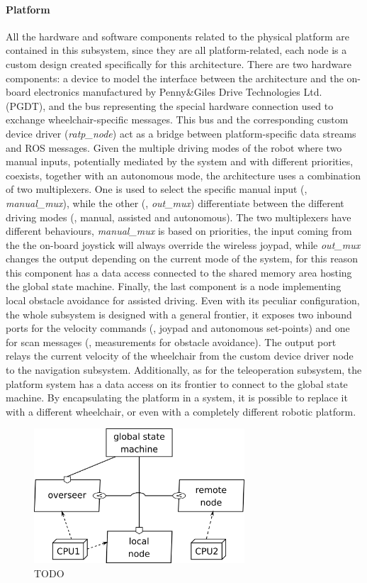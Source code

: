 \paragraph{Platform} All the hardware and software components related to the physical platform are contained in this subsystem, since they are all platform-related, each node is a custom design created specifically for this architecture. There are two hardware components: a device to model the interface between the architecture and the on-board electronics manufactured by Penny\&Giles Drive Technologies Ltd. (PGDT), and the bus representing the special hardware connection used to exchange wheelchair-specific messages. This bus and the corresponding custom device driver (\textit{ratp\_node}) act as a bridge between platform-specific data streams and ROS messages. Given the multiple driving modes of the robot where two manual inputs, potentially mediated by the system and with different priorities, coexists, together with an autonomous mode, the architecture uses a combination of two multiplexers. One is used to select the specific manual input (\ie, \textit{manual\_mux}), while the other (\ie, \textit{out\_mux}) differentiate between the different driving modes (\ie, manual, assisted and autonomous). The two multiplexers have different behaviours, \textit{manual\_mux} is based on priorities, the input coming from the the on-board joystick will always override the wireless joypad, while \textit{out\_mux} changes the output depending on the current mode of the system, for this reason this component has a data access connected to the shared memory area hosting the global state machine. Finally, the last component is a node implementing local obstacle avoidance for assisted driving. Even with its peculiar configuration, the whole subsystem is designed with a general frontier, it exposes two inbound ports for the velocity commands (\ie, joypad and autonomous set-points) and one for scan messages (\ie, measurements for obstacle avoidance). The output port relays the current velocity of the wheelchair from the custom device driver node to the navigation subsystem. Additionally, as for the teleoperation subsystem, the platform system has a data access on its frontier to connect to the global state machine. By encapsulating the platform in a system, it is possible to replace it with a different wheelchair, or even with a completely different robotic platform.

\begin{figure}[t]
\centering
\includegraphics[width=0.7\textwidth]{gfx/pmk/overseer}
\caption{TODO}
\label{fig:pmk-gsm}
\end{figure}

